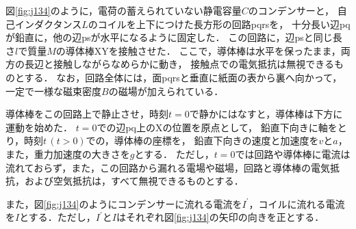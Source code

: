 \setcounter{figure}{0}
図\ref{fig:j134}のように，電荷の蓄えられていない静電容量$C$のコンデンサーと，
自己インダクタンス$L$のコイルを上下につけた長方形の回路pqrsを，
十分長い辺pqが鉛直に，他の辺psが水平になるように固定した．
この回路に，辺psと同じ長さ$l$で質量$M$の導体棒XYを接触させた．
ここで，導体棒は水平を保ったまま，両方の長辺と接触しながらなめらかに動き，
接触点での電気抵抗は無視できるものとする．
なお，回路全体には，面pqrsと垂直に紙面の表から裏へ向かって，一定で一様な磁束密度$B$の磁場が加えられている．

導体棒をこの回路上で静止させ，時刻$t=0$で静かにはなすと，導体棒は下方に運動を始めた．
$t=0$での辺pq上のXの位置を原点として，
鉛直下向きに\x 軸をとり，時刻$t\,(t>0)$での，導体棒の座標を\x ，
鉛直下向きの速度と加速度を$v$と$a$，
また，重力加速度の大きさを$g$とする．
ただし，$t=0$では回路や導体棒に電流は流れておらず，また，この回路から漏れる電場や磁場，回路と導体棒の電気抵抗，および空気抵抗は，すべて無視できるものとする．

また，図\ref{fig:j134}のようにコンデンサーに流れる電流を$I^\prime$，コイルに流れる電流を$I$とする．ただし，$I^\prime$と$I$はそれぞれ図\ref{fig:j134}の矢印の向きを正とする．

